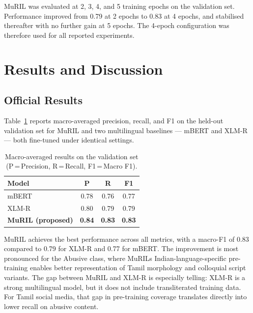 \documentclass[11pt]{article}
\begin{document}
MuRIL was evaluated at 2, 3, 4, and 5 training epochs on the validation set.
Performance improved from 0.79 at 2 epochs to 0.83 at 4 epochs, and stabilised
thereafter with no further gain at 5 epochs. The 4-epoch configuration was therefore
used for all reported experiments.

\section{Results and Discussion}

\subsection{Official Results}
Table~\ref{tab:results} reports macro-averaged precision, recall, and F1 on the
held-out validation set for MuRIL and two multilingual baselines --- mBERT
\citep{devlin2019} and XLM-R \citep{conneau2020} --- both fine-tuned under identical
settings.

\begin{table}[H]
\centering\small
\setlength{\tabcolsep}{5pt}\renewcommand{\arraystretch}{1.1}
\begin{tabular}{lccc}
\toprule
\rowcolor{headerblue}\textbf{Model} & \textbf{P} & \textbf{R} & \textbf{F1} \\
\midrule
mBERT              & 0.78 & 0.76 & 0.77 \\
XLM-R              & 0.80 & 0.79 & 0.79 \\
\textbf{MuRIL (proposed)} & \textbf{0.84} & \textbf{0.83} & \textbf{0.83} \\
\bottomrule
\end{tabular}
\caption{Macro-averaged results on the validation set (P\,=\,Precision, R\,=\,Recall, F1\,=\,Macro F1).}
\label{tab:results}
\end{table}

MuRIL achieves the best performance across all metrics, with a macro-F1 of 0.83
compared to 0.79 for XLM-R and 0.77 for mBERT. The improvement is most pronounced
for the Abusive class, where MuRIL\textquotesingle{}s Indian-language-specific
pre-training enables better representation of Tamil morphology and colloquial script
variants. The gap between MuRIL and XLM-R is especially telling: XLM-R is a strong
multilingual model, but it does not include transliterated training data. For Tamil
social media, that gap in pre-training coverage translates directly into lower recall
on abusive content.
\end{document}
